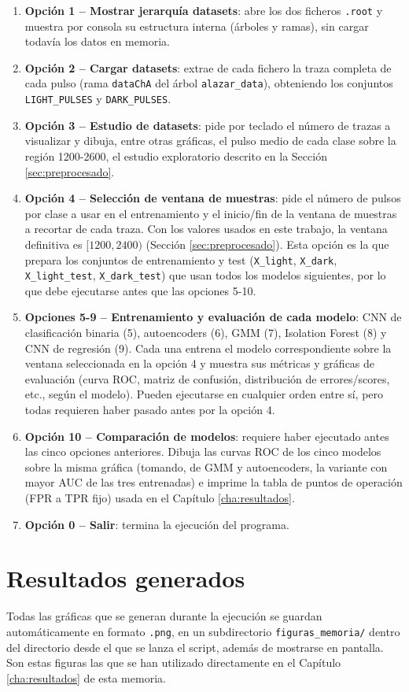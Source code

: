 \begin{enumerate}
	\item \textbf{Opción 1 -- Mostrar jerarquía datasets}: abre los dos ficheros \texttt{.root} y muestra por consola su estructura interna (árboles y ramas), sin cargar todavía los datos en memoria.
	\item \textbf{Opción 2 -- Cargar datasets}: extrae de cada fichero la traza completa de cada pulso (rama \texttt{dataChA} del árbol \texttt{alazar\_data}), obteniendo los conjuntos \texttt{LIGHT\_PULSES} y \texttt{DARK\_PULSES}.
	\item \textbf{Opción 3 -- Estudio de datasets}: pide por teclado el número de trazas a visualizar y dibuja, entre otras gráficas, el pulso medio de cada clase sobre la región 1200-2600, el estudio exploratorio descrito en la Sección \ref{sec:preprocesado}.
	\item \textbf{Opción 4 -- Selección de ventana de muestras}: pide el número de pulsos por clase a usar en el entrenamiento y el inicio/fin de la ventana de muestras a recortar de cada traza. Con los valores usados en este trabajo, la ventana definitiva es $[1200, 2400)$ (Sección \ref{sec:preprocesado}). Esta opción es la que prepara los conjuntos de entrenamiento y test (\texttt{X\_light}, \texttt{X\_dark}, \texttt{X\_light\_test}, \texttt{X\_dark\_test}) que usan todos los modelos siguientes, por lo que debe ejecutarse antes que las opciones 5-10.
	\item \textbf{Opciones 5-9 -- Entrenamiento y evaluación de cada modelo}: CNN de clasificación binaria (5), autoencoders (6), GMM (7), Isolation Forest (8) y CNN de regresión (9). Cada una entrena el modelo correspondiente sobre la ventana seleccionada en la opción 4 y muestra sus métricas y gráficas de evaluación (curva ROC, matriz de confusión, distribución de errores/scores, etc., según el modelo). Pueden ejecutarse en cualquier orden entre sí, pero todas requieren haber pasado antes por la opción 4.
	\item \textbf{Opción 10 -- Comparación de modelos}: requiere haber ejecutado antes las cinco opciones anteriores. Dibuja las curvas ROC de los cinco modelos sobre la misma gráfica (tomando, de GMM y autoencoders, la variante con mayor AUC de las tres entrenadas) e imprime la tabla de puntos de operación (FPR a TPR fijo) usada en el Capítulo \ref{cha:resultados}.
	\item \textbf{Opción 0 -- Salir}: termina la ejecución del programa.
\end{enumerate}

\section{Resultados generados}
\label{sec:resultados-generados}

Todas las gráficas que se generan durante la ejecución se guardan automáticamente en formato \texttt{.png}, en un subdirectorio \texttt{figuras\_memoria/} dentro del directorio desde el que se lanza el script, además de mostrarse en pantalla. Son estas figuras las que se han utilizado directamente en el Capítulo \ref{cha:resultados} de esta memoria.

